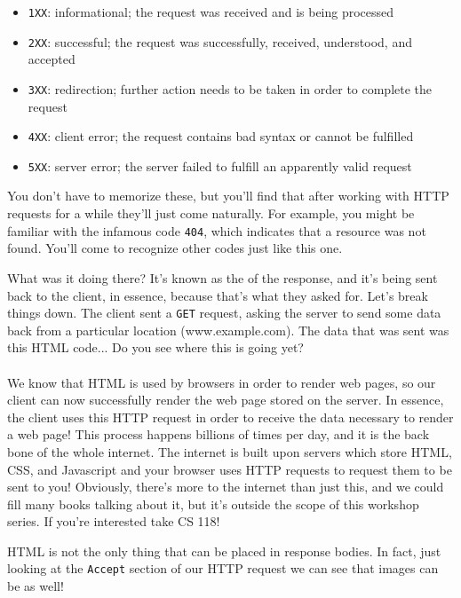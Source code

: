 \begin{itemize}
    \item \texttt{1XX}: informational; the request was received and is being processed
    \item \texttt{2XX}: successful; the request was successfully, received, understood, and accepted
    \item \texttt{3XX}: redirection; further action needs to be taken in order to complete the request
    \item \texttt{4XX}: client error; the request contains bad syntax or cannot be fulfilled
    \item \texttt{5XX}: server error; the server failed to fulfill an apparently valid request
\end{itemize}

You don't have to memorize these, but you'll find that after working with HTTP requests for a while they'll just come naturally. For example, you might be familiar with the infamous code \texttt{404}, which indicates that a resource was not found. You'll come to recognize other codes just like this one.

\begin{kaobox}[title=About the HTML we saw before\dots]
    What was it doing there? It's known as the  of the response, and it's being sent back to the client, in essence, because that's what they asked for. Let's break things down. The client sent a \texttt{GET} request, asking the server to send some data back from a particular location (www.example.com). The data that was sent was this HTML code... Do you see where this is going yet? \\ \\
    We know that HTML is used by browsers in order to render web pages, so our client can now successfully render the web page stored on the server. In essence, the client uses this HTTP request in order to receive the data necessary to render a web page! This process happens billions of times per day, and it is the back bone of the whole internet. The internet is built upon servers which store HTML, CSS, and Javascript and your browser uses HTTP requests to request them to be sent to you! Obviously, there's more to the internet than just this, and we could fill many books talking about it, but it's outside the scope of this workshop series. If you're interested take CS 118!
\end{kaobox}

HTML is not the only thing that can be placed in response bodies. In fact, just looking at the \texttt{Accept} section of our HTTP request we can see that images can be as well!

